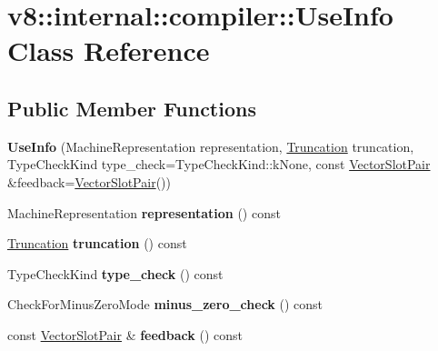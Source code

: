 \hypertarget{classv8_1_1internal_1_1compiler_1_1UseInfo}{}\section{v8\+:\+:internal\+:\+:compiler\+:\+:Use\+Info Class Reference}
\label{classv8_1_1internal_1_1compiler_1_1UseInfo}
\subsection*{Public Member Functions}
\begin{DoxyCompactItemize}
\item 
\mbox{\label{classv8_1_1internal_1_1compiler_1_1UseInfo_a3fbfed7ea9acb1f871ef650374d3ce51}} 
{\bfseries Use\+Info} (Machine\+Representation representation, \mbox{\hyperlink{classv8_1_1internal_1_1compiler_1_1Truncation}{Truncation}} truncation, Type\+Check\+Kind type\+\_\+check=Type\+Check\+Kind\+::k\+None, const \mbox{\hyperlink{classv8_1_1internal_1_1VectorSlotPair}{Vector\+Slot\+Pair}} \&feedback=\mbox{\hyperlink{classv8_1_1internal_1_1VectorSlotPair}{Vector\+Slot\+Pair}}())
\item 
\mbox{\label{classv8_1_1internal_1_1compiler_1_1UseInfo_aead6943866e070cea37e861c70981265}} 
Machine\+Representation {\bfseries representation} () const
\item 
\mbox{\label{classv8_1_1internal_1_1compiler_1_1UseInfo_a1682572d4785b6d594d9aa3270515fa3}} 
\mbox{\hyperlink{classv8_1_1internal_1_1compiler_1_1Truncation}{Truncation}} {\bfseries truncation} () const
\item 
\mbox{\label{classv8_1_1internal_1_1compiler_1_1UseInfo_a50a0c2af8d5f6c9f1c322eb8337fa4ae}} 
Type\+Check\+Kind {\bfseries type\+\_\+check} () const
\item 
\mbox{\label{classv8_1_1internal_1_1compiler_1_1UseInfo_adf3b4e9361b2b530e54e92b2145812d3}} 
Check\+For\+Minus\+Zero\+Mode {\bfseries minus\+\_\+zero\+\_\+check} () const
\item 
\mbox{\label{classv8_1_1internal_1_1compiler_1_1UseInfo_a9b6e08e55064e11b8e3c050a95ea6c7e}} 
const \mbox{\hyperlink{classv8_1_1internal_1_1VectorSlotPair}{Vector\+Slot\+Pair}} \& {\bfseries feedback} () const
\end{DoxyCompactItemize}
